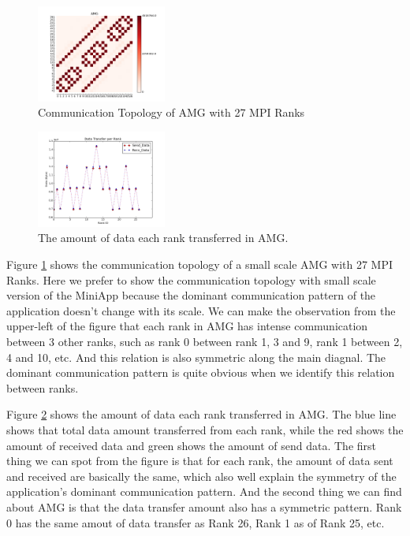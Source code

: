 \documentclass[conference]{IEEEtran}
\begin{document}
\begin{figure}[h!] 
  \centering
  \includegraphics[width=0.38\textwidth]{figs/amg/amg_ct}
   \caption{Communication Topology of AMG with 27 MPI Ranks }
   \label{fig: amg communication topology}
\end{figure}

\begin{figure}[h!] 
  \centering
  \includegraphics[width=0.38\textwidth]{figs/amg/amg_data_transfer}
   \caption{The amount of data each rank transferred in AMG. }
   \label{fig: amg data trans}
\end{figure}

Figure \ref{fig: amg communication topology} shows the communication topology of a small scale AMG with 27 MPI Ranks. Here we prefer to show the communication topology with small scale version of the MiniApp because the dominant communication pattern of the application doesn't change with its scale. We can make the observation from the upper-left of the figure that each rank in AMG has intense communication between 3 other ranks, such as rank 0 between rank 1, 3 and 9, rank 1 between 2, 4 and 10, etc. And this relation is also symmetric along the main diagnal. The dominant communication pattern is quite obvious when we identify this relation between ranks.

Figure \ref{fig: amg data trans} shows the amount of data each rank transferred in AMG. The blue line shows that total data amount transferred from each rank, while the red shows the amount of received data and green shows the amount of send data. The first thing we can spot from the figure is that for each rank, the amount of data sent and received are basically the same, which also well explain the symmetry of the application's dominant communication pattern. And the second thing we can find about AMG is that the data transfer amount also has a symmetric pattern. Rank 0 has the same amout of data transfer as Rank 26, Rank 1 as of Rank 25, etc.
\end{document}
